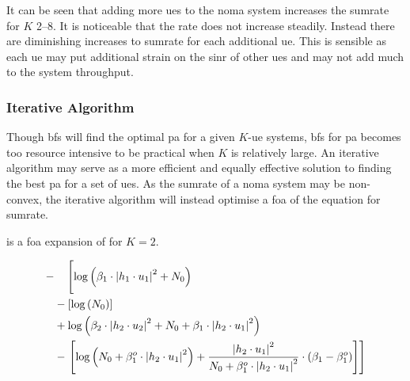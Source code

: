 \par
It can be seen that adding more \acp{ue} to the \ac{noma} system increases the sumrate for $K$ \SIrange{2}{8}{}.
It is noticeable that the rate does not increase steadily.
Instead there are diminishing increases to sumrate for each additional \ac{ue}.
This is sensible as each \ac{ue} may put additional strain on the \ac{sinr} of other \acp{ue} and may not add much to the system throughput.

\subsubsection{Iterative Algorithm}
Though \ac{bfs} will find the optimal \ac{pa} for a given $K$-\ac{ue} systems, \ac{bfs} for \ac{pa} becomes too resource intensive to be practical when $K$ is relatively large.
An iterative algorithm may serve as a more efficient and equally effective solution to finding the best \ac{pa} for a set of \acp{ue}.
As the sumrate of a \ac{noma} system may be non-convex, the iterative algorithm will instead optimise a \ac{foa} of the equation for sumrate.

\iffalse 
\par
The \ac{foa} for a 2-\ac{ue} \ac{noma} system follows \fref{eq:foa2ue}.
For a $K$-\ac{ue} system it is given by \fref{eq:foagen} and follows these constraints:

\begin{equation*}
	\begin{aligned}
			\min \quad &\null f(x)\\
			\text{s.t.} \quad &\null A \cdot B \leq B, A_{eq} \cdot X = B_{eq} \\
			&\null C(X) \leq 0, C_{eq}(X) = 0\\
			&\null LB \leq X \leq UB
	\end{aligned}
\end{equation*}

\par
Where $A$ is a vector of $1$'s that is $K$ long and $B$ is the maximum transmission power of a tower.
\fi

\par
 is a \ac{foa} expansion of  for $K=2$.

\begin{equation}
	\begin{aligned}
		- & \quad \left[\log \left( \beta_1 \cdot \left|h_1 \cdot u_1 \right|^2 + N_0 \right)
		\vphantom{ \frac{\left| h_2 \cdot u_1 \right|^2}{\left| h_2 \cdot \beta_1^o \cdot u_1 \right|^2} }
		\right. \\
		& - \left[ \log \left(  N_0 \right) \right] \\
		& + \log \left( \beta_2 \cdot \left|h_2 \cdot u_2 \right|^2 + N_0 + \beta_1 \cdot \left|h_2 \cdot u_1 \right|^2 \right) \\
		& - \left. \left[ \log \left(  N_0 + \beta_1^o \cdot \left|h_2 \cdot u_1 \right|^2 \right)
		+ \frac{\left| h_2 \cdot u_1 \right|^2}{N_0 + \beta_1^o \cdot \left| h_2 \cdot u_1 \right|^2}
		\cdot \left(\beta_1 - \beta_1^o \right)
		\right]
		\right]
	\end{aligned}
	\label{eq:foa2ue}
\end{equation}

